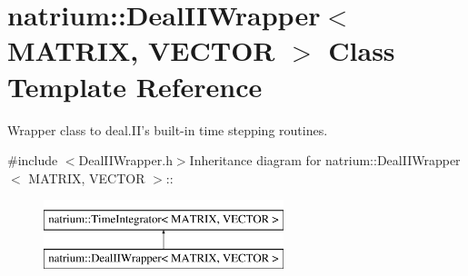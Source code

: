 \hypertarget{classnatrium_1_1DealIIWrapper}{
\section{natrium::DealIIWrapper$<$ MATRIX, VECTOR $>$ Class Template Reference}
\label{classnatrium_1_1DealIIWrapper}
}


Wrapper class to deal.II's built-\/in time stepping routines.  


{\ttfamily \#include $<$DealIIWrapper.h$>$}Inheritance diagram for natrium::DealIIWrapper$<$ MATRIX, VECTOR $>$::\begin{figure}[H]
\begin{center}
\leavevmode
\includegraphics[height=2cm]{classnatrium_1_1DealIIWrapper}
\end{center}
\end{figure}
